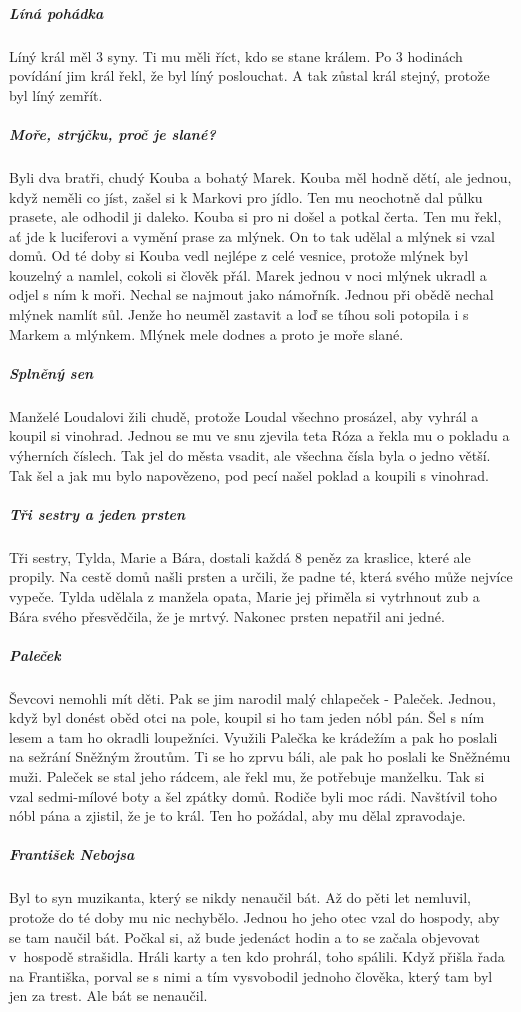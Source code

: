 {{\subparagraph{Líná pohádka}
	Líný král měl 3 syny. Ti mu měli říct, kdo se stane králem. Po 3 hodinách
	povídání jim král řekl, že byl líný poslouchat. A tak zůstal král stejný,
	protože byl líný zemřít.

\subparagraph{Moře, strýčku, proč je slané?}
	Byli dva bratři, chudý Kouba a bohatý Marek. Kouba měl hodně dětí, ale jednou,
	když neměli co jíst, zašel si k Markovi pro jídlo. Ten mu neochotně dal půlku
	prasete, ale odhodil ji daleko. Kouba si pro ni došel a potkal čerta. Ten mu
	řekl, ať jde k luciferovi a vymění prase za mlýnek. On to tak udělal a mlýnek
	si vzal domů. Od té doby si Kouba vedl nejlépe z celé vesnice, protože mlýnek
	byl kouzelný a namlel, cokoli si člověk přál. Marek jednou v noci mlýnek ukradl
	a odjel s ním k moři. Nechal se najmout jako námořník. Jednou při obědě nechal
	mlýnek namlít sůl. Jenže ho neuměl zastavit a loď se tíhou soli potopila i s
	Markem a mlýnkem. Mlýnek mele dodnes a proto je moře slané.

\subparagraph{Splněný sen}
	Manželé Loudalovi žili chudě, protože Loudal všechno prosázel, aby vyhrál a
	koupil si vinohrad. Jednou se mu ve snu zjevila teta Róza a řekla mu o pokladu
	a výherních číslech. Tak jel do města vsadit, ale všechna čísla byla o jedno
	větší. Tak šel a jak mu bylo napovězeno, pod pecí našel poklad a koupili s
	vinohrad.

\subparagraph{Tři sestry a jeden prsten}
	Tři sestry, Tylda, Marie a Bára, dostali každá 8 peněz za kraslice, které ale
	propily. Na cestě domů našli prsten a určili, že padne té, která svého může
	nejvíce vypeče. Tylda udělala z manžela opata, Marie jej přiměla si vytrhnout
	zub a Bára svého přesvědčila, že je mrtvý. Nakonec prsten nepatřil ani jedné.

\subparagraph{Paleček}
	Ševcovi nemohli mít děti. Pak se jim narodil malý chlapeček - Paleček. Jednou,
	když byl donést oběd otci na pole, koupil si ho tam jeden nóbl pán. Šel s ním
	lesem a tam ho okradli loupežníci. Využili Palečka ke krádežím a pak ho poslali
	na sežrání Sněžným žroutům. Ti se ho zprvu báli, ale pak ho poslali ke Sněžnému
	muži. Paleček se stal jeho rádcem, ale řekl mu, že potřebuje manželku. Tak si
	vzal sedmi-mílové boty a šel zpátky domů. Rodiče byli moc rádi. Navštívil toho
	nóbl pána a zjistil, že je to král. Ten ho požádal, aby mu dělal zpravodaje.

\subparagraph{František Nebojsa}
	Byl to syn muzikanta, který se nikdy nenaučil bát. Až do pěti let nemluvil,
	protože do té doby mu nic nechybělo. Jednou ho jeho otec vzal do hospody, aby
	se tam naučil bát. Počkal si, až bude jedenáct hodin a to se začala objevovat
	v~hospodě strašidla. Hráli karty a ten kdo prohrál, toho spálili. Když přišla
	řada na Františka, porval se s nimi a tím vysvobodil jednoho člověka, který tam
	byl jen za trest. Ale bát se nenaučil.

}}
